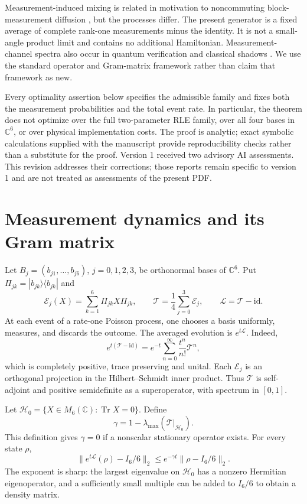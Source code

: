 \documentclass[11pt,a4paper]{article}
\theoremstyle{remark}
\DeclareMathOperator{\Tr}{Tr}
\newcommand{\id}{\mathrm{id}}
\newcommand{\C}{\mathbb C}
\newcommand{\E}{\mathcal E}
\newcommand{\T}{\mathcal T}
\newcommand{\HH}{\mathcal H_0}
\begin{document}
Measurement-induced mixing is related in motivation to noncommuting block-measurement diffusion \cite{eriksson}, but the processes differ. The present generator is a fixed average of complete rank-one measurements minus the identity. It is not a small-angle product limit and contains no additional Hamiltonian. Measurement-channel spectra also occur in quantum verification \cite{zhu} and classical shadows \cite{ippoliti}. We use the standard operator and Gram-matrix framework rather than claim that framework as new.

Every optimality assertion below specifies the admissible family and fixes both the measurement probabilities and the total event rate. In particular, the theorem does not optimize over the full two-parameter RLE family, over all four bases in $\C^6$, or over physical implementation costs. The proof is analytic; exact symbolic calculations supplied with the manuscript provide reproducibility checks rather than a substitute for the proof. Version 1 received two advisory AI assessments. This revision addresses their corrections; those reports remain specific to version 1 and are not treated as assessments of the present PDF.

\section{Measurement dynamics and its Gram matrix}
Let $B_j=(b_{j1},\ldots,b_{j6})$, $j=0,1,2,3$, be orthonormal bases of $\C^6$. Put $\Pi_{jk}=|b_{jk}\rangle\langle b_{jk}|$ and
\begin{equation}\label{eq:channel}
 \E_j(X)=\sum_{k=1}^6\Pi_{jk}X\Pi_{jk},\qquad
 \T=\frac14\sum_{j=0}^3\E_j,\qquad \mathcal L=\T-\id.
\end{equation}
At each event of a rate-one Poisson process, one chooses a basis uniformly, measures, and discards the outcome. The averaged evolution is $e^{t\mathcal L}$. Indeed,
\[
 e^{t(\T-\id)}=e^{-t}\sum_{n=0}^{\infty}\frac{t^n}{n!}\T^n,
\]
which is completely positive, trace preserving and unital. Each $\E_j$ is an orthogonal projection in the Hilbert--Schmidt inner product. Thus $\T$ is self-adjoint and positive semidefinite as a superoperator, with spectrum in $[0,1]$.

Let $\HH=\{X\in M_6(\C):\Tr X=0\}$. Define
\begin{equation}\label{eq:gap}
 \gamma=1-\lambda_{\max}(\T|_{\HH}).
\end{equation}
This definition gives $\gamma=0$ if a nonscalar stationary operator exists. For every state $\rho$,
\begin{equation}\label{eq:decay}
 \|e^{t\mathcal L}(\rho)-I_6/6\|_2
 \le e^{-\gamma t}\|\rho-I_6/6\|_2.
\end{equation}
The exponent is sharp: the largest eigenvalue on $\HH$ has a nonzero Hermitian eigenoperator, and a sufficiently small multiple can be added to $I_6/6$ to obtain a density matrix.
\end{document}
